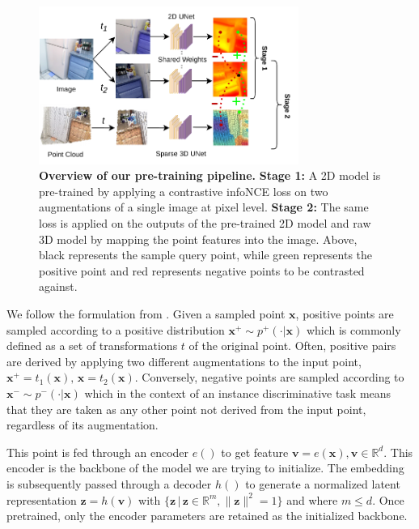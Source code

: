 \documentclass[10pt,twocolumn,letterpaper]{article}
\begin{document}
\begin{figure}
    \centering
    \includegraphics[width=8.5cm]{images/overview.pdf}
    \caption{
        \textbf{Overview of our pre-training pipeline.} \textbf{Stage 1:} A 2D model is pre-trained by applying a contrastive infoNCE loss on two augmentations of a single image at pixel level. \textbf{Stage 2:} The same loss is applied on the outputs of the pre-trained 2D model and raw 3D model by mapping the point features into the image. Above, black represents the sample query point, while green represents the positive point and red represents negative points to be contrasted against.
    }
    \label{fig:overview}
\end{figure}


We follow the formulation from \cite{le-khac_contrastive_2020}. Given a sampled point $\mathbf{x}$, positive points are sampled according to a positive distribution $\mathbf{x}^{+} \sim p^{+}( \cdot | \mathbf{x})$ which is commonly defined as a set of transformations $t$ of the original point. Often, positive pairs are derived by applying two different augmentations to the input point, $\mathbf{x}^{+} = t_{1}(\mathbf{x}), \, \mathbf{x} = t_{2}(\mathbf{x})$. Conversely, negative points are sampled according to $\mathbf{x}^{-} \sim p^{-}( \cdot | \mathbf{x})$ which in the context of an instance discriminative task means that they are taken as any other point not derived from the input point, regardless of its augmentation.

This point is fed through an encoder $e()$ to get feature $\mathbf{v} = e(\mathbf{x}), \mathbf{v} \in \mathbb{R}^d$. This encoder is the backbone of the model we are trying to initialize. The embedding is subsequently passed through a decoder $h()$ to generate a normalized latent representation $\mathbf{z}=h(\mathbf{v})$ with $\{\mathbf{z} \, | \, \mathbf{z} \in \mathbb{R}^{m}, \lVert \mathbf{z} \lVert^{2} = 1\}$  and where $m \leq d$. Once pretrained, only the encoder parameters are retained as the initialized backbone.
\end{document}
